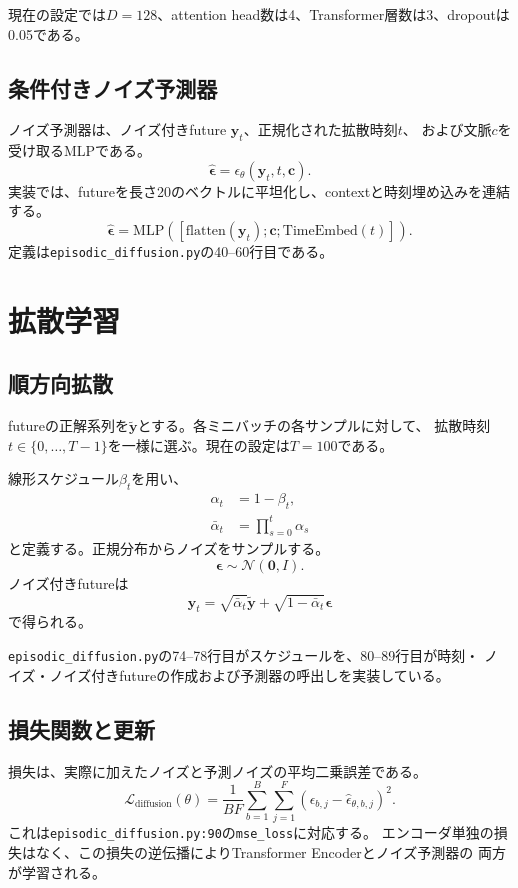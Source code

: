 \documentclass[a4paper,11pt]{bxjsarticle}
\begin{document}
現在の設定では$D=128$、attention head数は4、Transformer層数は3、dropoutは0.05である。

\subsection{条件付きノイズ予測器}
ノイズ予測器は、ノイズ付きfuture $\mathbf{y}_t$、正規化された拡散時刻$t$、
および文脈$c$を受け取るMLPである。
\begin{equation}
  \hat{\boldsymbol{\epsilon}}=
  \epsilon_\theta(\mathbf{y}_t,t,\mathbf{c}).
\end{equation}
実装では、futureを長さ20のベクトルに平坦化し、contextと時刻埋め込みを連結する。
\begin{equation}
  \hat{\boldsymbol{\epsilon}}=
  \mathrm{MLP}([\mathrm{flatten}(\mathbf{y}_t);\mathbf{c};\mathrm{TimeEmbed}(t)]).
\end{equation}
定義は\texttt{episodic\_diffusion.py}の40--60行目である。

\section{拡散学習}
\subsection{順方向拡散}
futureの正解系列を$\tilde{\mathbf{y}}$とする。各ミニバッチの各サンプルに対して、
拡散時刻$t\in\{0,\ldots,T-1\}$を一様に選ぶ。現在の設定は$T=100$である。

線形スケジュール$\beta_t$を用い、
\begin{align}
  \alpha_t &= 1-\beta_t, \\
  \bar{\alpha}_t &= \prod_{s=0}^{t}\alpha_s
\end{align}
と定義する。正規分布からノイズをサンプルする。
\begin{equation}
  \boldsymbol{\epsilon}\sim\mathcal{N}(\mathbf{0},I).
\end{equation}
ノイズ付きfutureは
\begin{equation}
  \mathbf{y}_t=
  \sqrt{\bar{\alpha}_t}\tilde{\mathbf{y}}+
  \sqrt{1-\bar{\alpha}_t}\boldsymbol{\epsilon}
\end{equation}
で得られる。

\texttt{episodic\_diffusion.py}の74--78行目がスケジュールを、80--89行目が時刻・
ノイズ・ノイズ付きfutureの作成および予測器の呼出しを実装している。

\subsection{損失関数と更新}
損失は、実際に加えたノイズと予測ノイズの平均二乗誤差である。
\begin{equation}
  \mathcal{L}_{\mathrm{diffusion}}(\theta)=
  \frac{1}{BF}\sum_{b=1}^{B}\sum_{j=1}^{F}
  \left(\epsilon_{b,j}-\hat{\epsilon}_{\theta,b,j}\right)^2.
\end{equation}
これは\texttt{episodic\_diffusion.py:90}の\texttt{mse\_loss}に対応する。
エンコーダ単独の損失はなく、この損失の逆伝播によりTransformer Encoderとノイズ予測器の
両方が学習される。
\end{document}
